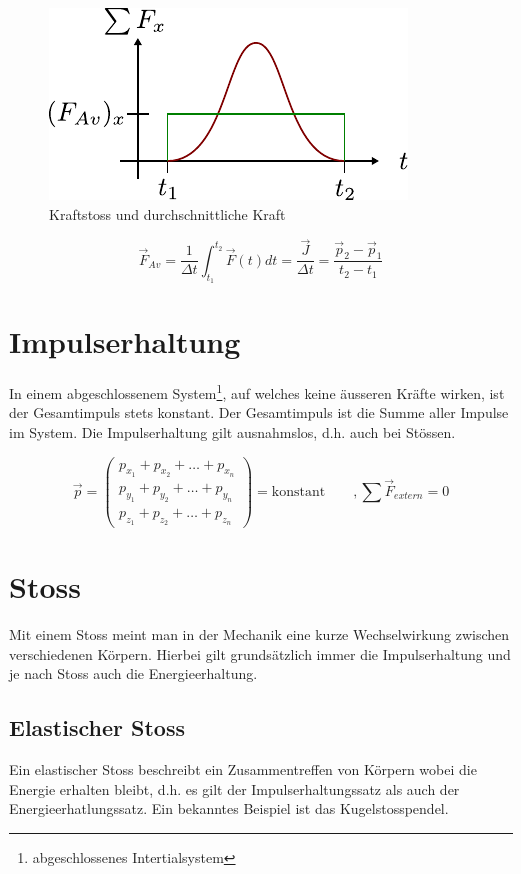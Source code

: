 \begin{figure}[h!]
	\centering
	\includegraphics[scale=0.75]{../fig/kraftstoss.pdf}
	\caption{Kraftstoss und durchschnittliche Kraft}
	\label{fig:kraftstoss}
\end{figure}

\[ \boxed{\vec{F}_{Av} = \frac{1}{\Delta t} \int_{t_1}^{t_2} \vec{F}(t)dt = 
	\frac{\vec{J}}{\Delta t} = \frac{\vec{p}_2 - \vec{p}_1}{t_2 - t_1}} \]

\section{Impulserhaltung}
In einem abgeschlossenem System\footnote{abgeschlossenes Intertialsystem},
auf welches keine äusseren Kräfte wirken, ist der Gesamtimpuls stets 
konstant. Der Gesamtimpuls ist die Summe aller Impulse im System. 
Die Impulserhaltung gilt ausnahmslos, d.h. auch bei Stössen.

\[ \boxed{\vec{p} =
\begin{pmatrix}
	p_{x_1} + p_{x_2} + \dots + p_{x_n} \\
	p_{y_1} + p_{y_2} + \dots + p_{y_n} \\
	p_{z_1} + p_{z_2} + \dots + p_{z_n} 
\end{pmatrix}
= \text{konstant}
\qquad ,\sum \vec{F}_{extern}=0
}\]

\section{Stoss}
Mit einem Stoss meint man in der Mechanik eine kurze Wechselwirkung zwischen
verschiedenen Körpern. Hierbei gilt grundsätzlich immer die Impulserhaltung
und je nach Stoss auch die Energieerhaltung.

\subsection{Elastischer Stoss}
Ein elastischer Stoss beschreibt ein Zusammentreffen von Körpern wobei die
Energie erhalten bleibt, d.h. es gilt der Impulserhaltungssatz als auch der
Energieerhatlungssatz. Ein bekanntes Beispiel ist das Kugelstosspendel.

